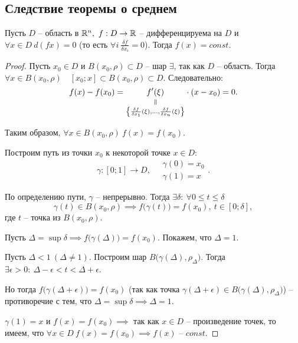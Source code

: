 \subsection{Следствие теоремы о среднем}

\begin{corollary}
    Пусть $ D $ -- область в $ \mathbb{R}^n, \ f:D \rightarrow \mathbb{R} $ -- дифференцируема на $ D $ и $ \forall x \in D \ d(fx) = 0 $ (то есть $ \forall i \ \frac{\delta f}{\delta x_i} = 0 $). Тогда $ f(x) = const $.
\end{corollary}

\begin{proof}
    Пусть $ x_0 \in D $ и $ B(x_0,\rho)\subset D $ -- шар $ \exists $, так как $ D $ -- область. Тогда $ \forall x \in B(x_0,\rho) \quad [x_0;x]\subset B(x_0,\rho)\subset D $. Следовательно:
    \[
        f(x) - f(x_0) = \equalto{f'(\xi)}{\left\{\frac{\delta f}{\delta x_1}(\xi),\ldots,\frac{\delta f}{\delta x_n}(\xi)\right\}}\cdot (x-x_0) = 0.
    \]

    Таким образом, $ \forall x \in B(x_0,\rho) \ f(x) = f(x_0) $.

    Построим путь из точки $ x_0 $ к некоторой точке $ x \in D $:
    \[
        \gamma:[0;1]\rightarrow D, \quad \begin{array}{l}
            \gamma(0) = x_0 \\
            \gamma(1) = x
        \end{array}.
    \]

    По определению пути, $ \gamma $ -- непрерывно. Тогда $ \exists\delta: \ \forall 0 \leqslant t \leqslant\delta$
    \[
        \gamma(t) \in B(x_0,\rho) \implies f\big(\gamma(t)\big) = f(x_0), \ t \in [0;\delta],
    \] где $ t $ -- точка из $ B(x_0,\rho) $.

    Пусть $ \Delta = \sup\delta \implies f\big(\gamma(\Delta)\big) = f(x_0) $. Покажем, что $\Delta = 1$.

    Пусть $ \Delta < 1 \ (\Delta \ne 1) $. Построим шар $ B\big(\gamma(\Delta),\rho_\Delta\big) $. Тогда $ \exists \epsilon > 0: \ \Delta - \epsilon < t < \Delta + \epsilon $.

    Но тогда $ f\big(\gamma(\Delta + \epsilon)\big) = f(x_0) $ (так как точка $ \gamma(\Delta + \epsilon) \in B\big(\gamma(\Delta),\rho_\Delta\big) $) -- противоречие с тем, что $ \Delta = \sup\delta \implies \Delta = 1 $.

    $ \gamma(1) = x $ и $ f(x) = f(x_0) \implies $ так как $ x \in D $ -- произведение точек, то имеем, что $ \forall x \in D \ f(x) = f(x_0) \implies f(x)\text{ -- }const $.
\end{proof}

